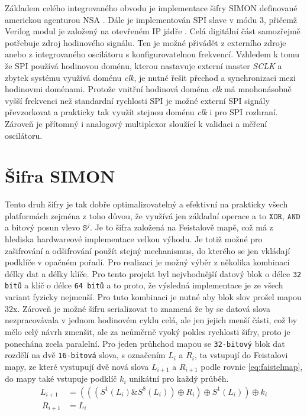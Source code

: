 Základem celého integrovaného obvodu je implementace šifry SIMON definované americkou agenturou NSA \cite{beaulieu2013simon}. Dále je implementován SPI slave v módu 3, přičemž Verilog modul je založený na otevřeném IP jádře \cite{santhosh2014spi}. Celá digitální část samozřejmě potřebuje zdroj hodinového signálu.
Ten je možné přivádět z externího zdroje anebo z integrovaného oscilátoru s konfigurovatelnou frekvencí.
Vzhledem k tomu že SPI používá hodinovou doménu, kterou nastavuje externí master \textit{SCLK} a zbytek systému využívá doménu  \textit{clk}, je nutné řešit přechod a synchronizaci mezi hodinovmi doménami. Protože vnitřní hodinová doména \textit{clk} má mnohonásobně vyšší frekvenci než standardní rychlosti SPI je možné externí SPI signály převzorkovat a prakticky tak využít stejnou doménu \textit{clk} i pro SPI rozhraní.
Zároveň je přítomný i analogový multiplexor sloužící k validaci a měření oscilátoru.

\section{Šifra SIMON}
Tento druh šifry je tak dobře optimalizovatelný a efektivní na prakticky všech platformách zejména z toho důvou, že využívá jen základní operace a to $\texttt{XOR}$, $\texttt{AND}$ a bitový posun vlevo $\texttt{S}^j$. Je to šifra založená na Feistalově mapě,
což má z hlediska hardwareové implementace velkou výhodu. Je totiž možné pro zašifrování a odšifrování použít stejný mechanismus, do kterého se jen vkládají podklíče v opačném pořadí.
\newline
Pro realizaci je možný výběr z několika kombinací délky dat a délky klíče. Pro tento projekt byl nejvhodnější datový blok o délce \texttt{32 bitů} a klíč o délce \texttt{64 bitů} a to proto, že výsledná implementace je ze všech variant fyzicky nejmenší. Pro tuto kombinaci je nutné aby blok slov prošel mapou 32x.
Zároveň je možné šifru serializovat to znamená že by se datová slova nezpracovávala v jednom hodinovém cyklu celá, ale jen jejich menší části, což by mělo celý návrh zmenšit, ale za neůměrně vyoký pokles rychlosti šifry, proto je ponechána zcela paralelní.  
\newline
Pro jeden průhchod mapou se \texttt{32-bitový} blok dat rozdělí na dvě \texttt{16-bitová} slova, s označením $L_i$ a $R_i$, ta vstupují do Feistalovi mapy, ze které vystupují dvě nová slova $L_{i+1}$ a $R_{i+1}$ podle rovnic \ref{eq:faistelmap}, do mapy také vstupuje podklíč ${k_i}$ unikátní pro každý průběh\cite{beaulieu2013simon}.
\begin{equation} \label{eq:faistelmap}
    \begin{aligned}
        L_{i+1} &= (((S^1(L_i)\&S^8(L_i))\oplus R_i)\oplus S^1(L_i))\oplus k_i\\\
        R_{i+1} &= L_i
    \end{aligned}
\end{equation}

